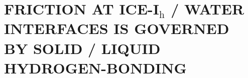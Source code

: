 
\newcommand*{\citen}[1]{%
  \begingroup
    \romannumeral-`\x %
    \setcitestyle{numbers}%
    \cite{#1}%
  \endgroup   
}

\chapter{FRICTION AT ICE-I$_\mathrm{h}$ / WATER INTERFACES IS GOVERNED
  BY SOLID / LIQUID HYDROGEN-BONDING}



% 


